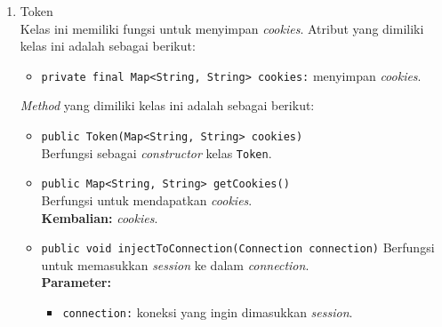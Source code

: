 \begin{enumerate}
\item{Token}\\
Kelas ini memiliki fungsi untuk menyimpan \textit{cookies}. Atribut yang dimiliki kelas ini adalah sebagai berikut:
	\begin{itemize}
        \item \texttt{private final Map<String, String> cookies:} menyimpan \textit{cookies}.
	\end{itemize}
	
	\textit{Method} yang dimiliki kelas ini adalah sebagai berikut:
	\begin{itemize}
	    \item \texttt{public Token(Map<String, String> cookies)}\\
	    Berfungsi sebagai \textit{constructor} kelas \texttt{Token}.
	    
	    \item \texttt{public Map<String, String> getCookies()}\\
	    Berfungsi untuk mendapatkan \textit{cookies}.\\
        \textbf{Kembalian:} \textit{cookies}.
        
        \item \texttt{public void injectToConnection(Connection connection)}
        Berfungsi untuk memasukkan \textit{session} ke dalam \textit{connection}.\\
        \textbf{Parameter:}
		\begin{itemize}
		    \item \texttt{connection:} koneksi yang ingin dimasukkan \textit{session}.
		\end{itemize}
    \end{itemize}
\end{enumerate}

